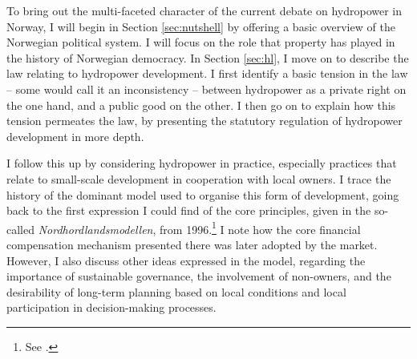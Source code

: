 %

To bring out the multi-faceted character of the current debate on hydropower in Norway, I will begin in Section \ref{sec:nutshell} by offering a basic overview of the Norwegian political system. I will focus on the role that property has played in the history of Norwegian democracy. In Section \ref{sec:hl}, I move on to describe the law relating to hydropower development. I first identify a basic tension in the law -- some would call it an inconsistency -- between hydropower as a private right on the one hand, and a public good on the other. I then go on to explain how this tension permeates the law, by presenting the statutory regulation of hydropower development in more depth.

I follow this up by considering hydropower in practice, especially practices that relate to small-scale development in cooperation with local owners. I trace the history of the dominant model used to organise this form of development, going back to the first expression I could find of the core principles, given in the so-called {\it Nordhordlandsmodellen}, from 1996.\footnote{See \cite{dyrkolbotn96}.} I note how the core financial compensation mechanism presented there was later adopted by the market. However, I also discuss other ideas expressed in the model, regarding the importance of sustainable governance, the involvement of non-owners, and the desirability of long-term planning based on local conditions and local participation in decision-making processes.

